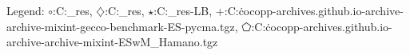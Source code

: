 Legend: {\color{CornflowerBlue}$\circ$}:C:\Users\tristan\Documents\ppsn\BBOB\raw\_res\IC, {\color{Orange}$\diamondsuit$}:C:\Users\tristan\Documents\ppsn\BBOB\raw\_res\LB, {\color{Green}$\star$}:C:\Users\tristan\Documents\ppsn\BBOB\raw\_res\IC-LB, {\color{red}+}:C:\Users\tristan\.cocopp\data-archives\numbbo.github.io\data-archive\data-archive\bbob-mixint-gecco-benchmark\CMA-ES-pycma.tgz, {\color{magenta}$\pentagon$}:C:\Users\tristan\.cocopp\data-archives\numbbo.github.io\data-archive\data-archive\bbob-mixint\CMA-ESwM\_Hamano.tgz